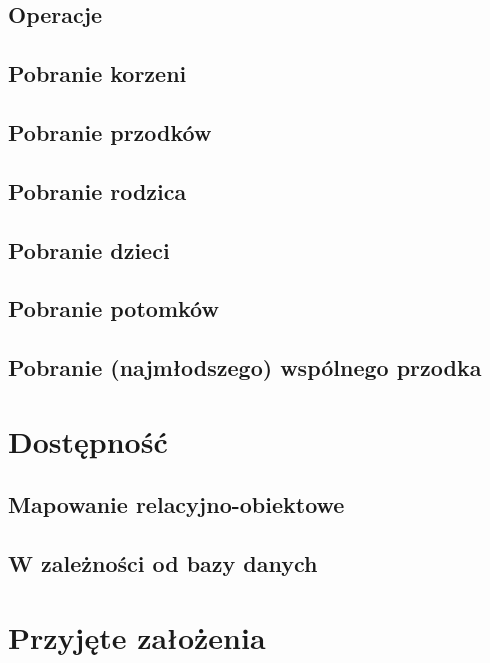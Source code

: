 \begin{description}
\begin{description}
\subsection{Operacje}
\subsection{Pobranie korzeni}
\subsection{Pobranie przodków}
\subsection{Pobranie rodzica}
\subsection{Pobranie dzieci}
\subsection{Pobranie potomków}
\subsection{Pobranie (najmłodszego) wspólnego przodka}




\section{Dostępność}
\subsection{Mapowanie relacyjno-obiektowe}
\subsection{W zależności od bazy danych}


\section{Przyjęte założenia}


\end{description}
\end{description}
